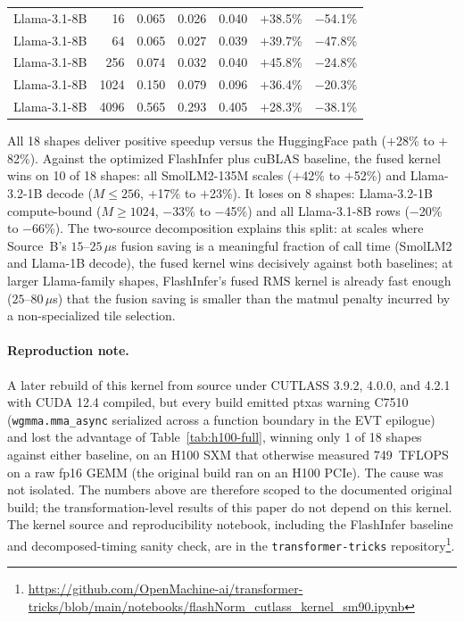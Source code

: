 \documentclass{article}
\begin{document}
\begin{table}[h!]
\begin{tabular}{l r r r r r r}
Llama-3.1-8B & 16   & 0.065 & 0.026 & 0.040 & $+$38.5\% & $-$54.1\% \\
Llama-3.1-8B & 64   & 0.065 & 0.027 & 0.039 & $+$39.7\% & $-$47.8\% \\
Llama-3.1-8B & 256  & 0.074 & 0.032 & 0.040 & $+$45.8\% & $-$24.8\% \\
Llama-3.1-8B & 1024 & 0.150 & 0.079 & 0.096 & $+$36.4\% & $-$20.3\% \\
Llama-3.1-8B & 4096 & 0.565 & 0.293 & 0.405 & $+$28.3\% & $-$38.1\% \\
\hline
\end{tabular}
\end{table}

All 18 shapes deliver positive speedup versus the HuggingFace path ($+$28\% to $+$82\%). Against the optimized FlashInfer plus cuBLAS baseline, the fused kernel wins on 10 of 18 shapes: all SmolLM2-135M scales ($+$42\% to $+$52\%) and Llama-3.2-1B decode ($M \leq 256$, $+$17\% to $+$23\%). It loses on 8 shapes: Llama-3.2-1B compute-bound ($M \geq 1024$, $-$33\% to $-$45\%) and all Llama-3.1-8B rows ($-$20\% to $-$66\%). The two-source decomposition explains this split: at scales where Source~B's $15$--$25\,\mu$s fusion saving is a meaningful fraction of call time (SmolLM2 and Llama-1B decode), the fused kernel wins decisively against both baselines; at larger Llama-family shapes, FlashInfer's fused RMS kernel is already fast enough ($25$--$80\,\mu$s) that the fusion saving is smaller than the matmul penalty incurred by a non-specialized tile selection.

\paragraph{Reproduction note.} A later rebuild of this kernel from source under CUTLASS 3.9.2, 4.0.0, and 4.2.1 with CUDA 12.4 compiled, but every build emitted ptxas warning C7510 (\texttt{wgmma.mma\_async} serialized across a function boundary in the EVT epilogue) and lost the advantage of Table~\ref{tab:h100-full}, winning only 1 of 18 shapes against either baseline, on an H100 SXM that otherwise measured 749~TFLOPS on a raw fp16 GEMM (the original build ran on an H100 PCIe). The cause was not isolated. The numbers above are therefore scoped to the documented original build; the transformation-level results of this paper do not depend on this kernel.
The kernel source and reproducibility notebook, including the FlashInfer baseline and decomposed-timing sanity check, are in the \texttt{transformer-tricks} repository\footnote{\url{https://github.com/OpenMachine-ai/transformer-tricks/blob/main/notebooks/flashNorm\_cutlass\_kernel\_sm90.ipynb}}.
\end{document}

